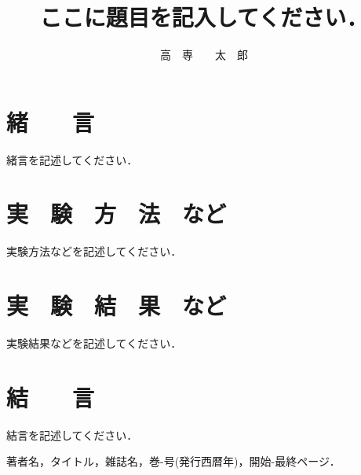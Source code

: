 \documentclass{advanced}
\title{ここに題目を記入してください．}
\author{高　専　　太　郎}
\begin{document}
\maketitle

\section{緒　　言}

緒言を記述してください．

\section{実　験　方　法　など}

実験方法などを記述してください．

\section{実　験　結　果　など}

実験結果などを記述してください．

\section{結　　言}

結言を記述してください．

\begin{thebibliography}{99}
	著者名，タイトル，雑誌名，巻-号(発行西暦年)，開始-最終ページ．
\end{thebibliography}
\end{document}
